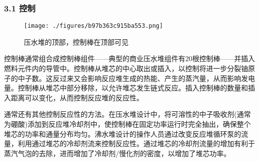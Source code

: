 \subsubsection{3.1 控制}
\begin{figure}[ht]
\centering
\texttt{[image: ./figures/b97b363c915ba553.png]}
\caption{压水堆的顶部，控制棒在顶部可见} \label{fig_QSFYD_4}
\end{figure}
控制棒通常组合成控制棒组件——典型的商业压水堆组件有20根控制棒——并插入燃料元件内的导管中。控制棒从堆芯的中心取出或插入，以控制将进一步分裂铀原子的中子数。这反过来又会影响反应堆生成的热能、产生的蒸汽量，从而影响发电量。控制棒从堆芯中部分移除，以允许堆芯发生链式反应。插入控制棒的数量和插入距离可以变化，从而控制反应堆的反应性。

通常还有其他控制反应性的方法。在压水堆设计中，将可溶性的中子吸收剂(通常为硼酸)添加到反应堆冷却剂中，使控制棒在固定功率运行时完全抽出，确保整个堆芯的功率和通量分布均匀。沸水堆设计的操作人员通过改变反应堆循环泵的流量，利用通过堆芯的冷却剂流来控制反应性。通过堆芯的冷却剂流量的增加有利于蒸汽气泡的去除，进而增加了冷却剂/慢化剂的密度，以增加了堆芯功率。